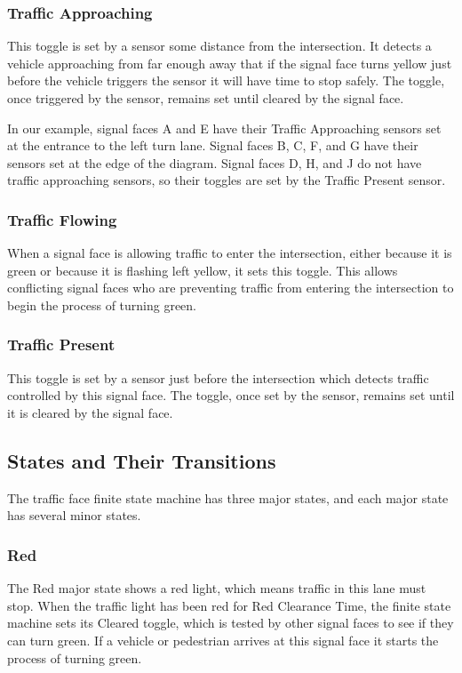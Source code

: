 \documentclass[letterpaper,twoside]{article}
\begin{document}
\subsubsection{Traffic Approaching}

This toggle is set by a sensor some distance from the intersection.
It detects a vehicle approaching from far enough away that if the
signal face turns yellow just before the vehicle triggers the sensor
it will have time to stop safely.
The toggle, once triggered by the sensor, remains set until cleared
by the signal face.

In our example, signal faces A and E have their Traffic Approaching
sensors set at the entrance to the left turn lane.  Signal faces
B, C, F, and G have their sensors set at the edge of the diagram.
Signal faces D, H, and J do not have traffic approaching sensors,
so their toggles are set by the Traffic Present sensor.

\subsubsection{Traffic Flowing}

When a signal face is allowing traffic to enter the intersection, either
because it is green or because it is flashing left yellow, it sets this
toggle.  This allows conflicting signal faces who are preventing traffic
from entering the intersection to begin the process of turning green.

\subsubsection{Traffic Present}

This toggle is set by a sensor just before the intersection which detects
traffic controlled by this signal face.
The toggle, once set by the sensor,  remains set until it is cleared
by the signal face.

\subsection{States and Their Transitions}

The traffic face finite state machine has three major states,
and each major state has several minor states.

\subsubsection{Red}
The Red major state shows a red light, which means traffic in this
lane must stop.  When the traffic light has been red for Red Clearance Time,
the finite state machine sets its Cleared toggle, which is tested by other
signal faces to see if they can turn green.  If a vehicle or
pedestrian arrives at this signal face it starts the process
of turning green.
\end{document}

